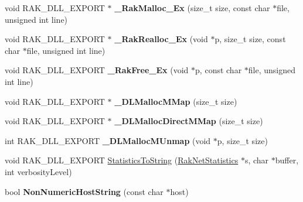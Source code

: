 \begin{DoxyCompactItemize}
\item 
\hypertarget{namespace_rak_net_acc243d041303d776a0eb6b5b78e3ae68}{void R\-A\-K\-\_\-\-D\-L\-L\-\_\-\-E\-X\-P\-O\-R\-T $\ast$ {\bfseries \-\_\-\-Rak\-Malloc\-\_\-\-Ex} (size\-\_\-t size, const char $\ast$file, unsigned int line)}\label{namespace_rak_net_acc243d041303d776a0eb6b5b78e3ae68}

\item 
\hypertarget{namespace_rak_net_a781c27d82a55ccb252ec0b4e1b6ff4c6}{void R\-A\-K\-\_\-\-D\-L\-L\-\_\-\-E\-X\-P\-O\-R\-T $\ast$ {\bfseries \-\_\-\-Rak\-Realloc\-\_\-\-Ex} (void $\ast$p, size\-\_\-t size, const char $\ast$file, unsigned int line)}\label{namespace_rak_net_a781c27d82a55ccb252ec0b4e1b6ff4c6}

\item 
\hypertarget{namespace_rak_net_ae4a385efe920b012a5452c2f76a6bff5}{void R\-A\-K\-\_\-\-D\-L\-L\-\_\-\-E\-X\-P\-O\-R\-T {\bfseries \-\_\-\-Rak\-Free\-\_\-\-Ex} (void $\ast$p, const char $\ast$file, unsigned int line)}\label{namespace_rak_net_ae4a385efe920b012a5452c2f76a6bff5}

\item 
\hypertarget{namespace_rak_net_afa7b6ea4f437a2f1eb5af40ec595ec37}{void R\-A\-K\-\_\-\-D\-L\-L\-\_\-\-E\-X\-P\-O\-R\-T $\ast$ {\bfseries \-\_\-\-D\-L\-Malloc\-M\-Map} (size\-\_\-t size)}\label{namespace_rak_net_afa7b6ea4f437a2f1eb5af40ec595ec37}

\item 
\hypertarget{namespace_rak_net_a425c716852e4688667f16175f8ccdd9d}{void R\-A\-K\-\_\-\-D\-L\-L\-\_\-\-E\-X\-P\-O\-R\-T $\ast$ {\bfseries \-\_\-\-D\-L\-Malloc\-Direct\-M\-Map} (size\-\_\-t size)}\label{namespace_rak_net_a425c716852e4688667f16175f8ccdd9d}

\item 
\hypertarget{namespace_rak_net_a24792bf0d5864e4830a301db56059f9d}{int R\-A\-K\-\_\-\-D\-L\-L\-\_\-\-E\-X\-P\-O\-R\-T {\bfseries \-\_\-\-D\-L\-Malloc\-M\-Unmap} (void $\ast$p, size\-\_\-t size)}\label{namespace_rak_net_a24792bf0d5864e4830a301db56059f9d}

\item 
void R\-A\-K\-\_\-\-D\-L\-L\-\_\-\-E\-X\-P\-O\-R\-T \hyperlink{namespace_rak_net_a49d0ff9db0d324a890e9c08add72a131}{Statistics\-To\-String} (\hyperlink{struct_rak_net_1_1_rak_net_statistics}{Rak\-Net\-Statistics} $\ast$s, char $\ast$buffer, int verbosity\-Level)
\item 
\hypertarget{namespace_rak_net_a33f012bd0ab6ec08d3bd2b4f66d5cac1}{bool {\bfseries Non\-Numeric\-Host\-String} (const char $\ast$host)}\label{namespace_rak_net_a33f012bd0ab6ec08d3bd2b4f66d5cac1}


\end{DoxyCompactItemize}
